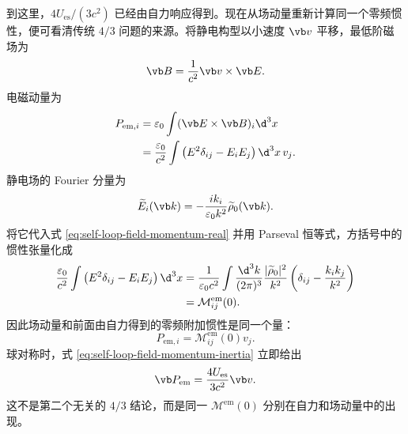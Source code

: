 到这里，$4U_{\mathrm{es}}/(3c^2)$ 已经由自力响应得到。现在从场动量重新计算同一个零频惯性，便可看清传统 $4/3$ 问题的来源。将静电构型以小速度 $\vb v$ 平移，最低阶磁场为
\begin{equation*}
 \vb B={1\over c^2}\vb v\times\vb E.
\end{equation*}
电磁动量为
\begin{align}
 P_{\mathrm{em},i}
 &=\varepsilon_0\int(\vb E\times\vb B)_i\d^3x
 \notag\\
 &={\varepsilon_0\over c^2}
 \int\left(E^2\delta_{ij}-E_iE_j\right)\d^3x\,v_j.
 \label{eq:self-loop-field-momentum-real}
\end{align}
静电场的 Fourier 分量为
\begin{equation*}
 \widetilde E_i(\vb k)
 =-{ik_i\over\varepsilon_0k^2}\widetilde\rho_0(\vb k).
\end{equation*}
将它代入式 \eqref{eq:self-loop-field-momentum-real} 并用 Parseval 恒等式，方括号中的惯性张量化成
\begin{align}
 {\varepsilon_0\over c^2}
 \int\left(E^2\delta_{ij}-E_iE_j\right)\d^3x
 &={1\over\varepsilon_0c^2}
 \int{\d^3k\over(2\pi)^3}
 {|\widetilde\rho_0|^2\over k^2}
 \left(\delta_{ij}-{k_i k_j\over k^2}\right)
 \notag\\
 &=\mathcal M_{ij}^{\mathrm{em}}(0).
 \label{eq:self-loop-field-momentum-equals-inertia}
\end{align}
因此场动量和前面由自力得到的零频附加惯性是同一个量：
\begin{equation}
 P_{\mathrm{em},i}
 =\mathcal M_{ij}^{\mathrm{em}}(0)v_j.
 \label{eq:self-loop-field-momentum-inertia}
\end{equation}
球对称时，式 \eqref{eq:self-loop-field-momentum-inertia} 立即给出
\begin{equation*}
 \vb P_{\mathrm{em}}
 ={4U_{\mathrm{es}}\over3c^2}\vb v.
\end{equation*}
这不是第二个无关的 $4/3$ 结论，而是同一 $\mathcal M^{\mathrm{em}}(0)$ 分别在自力和场动量中的出现。

